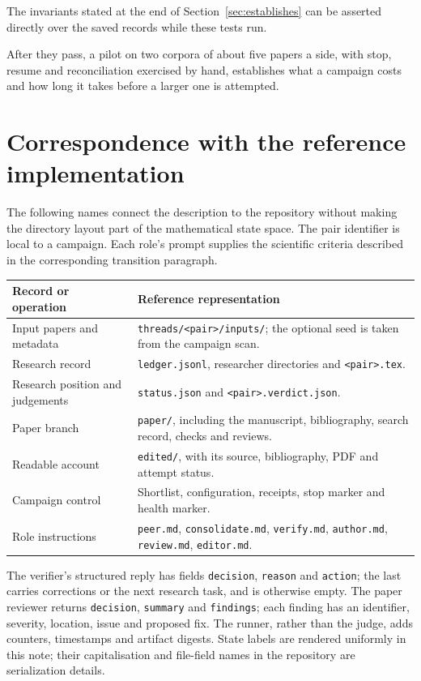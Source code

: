 \documentclass[11pt,a4paper]{article}
\newcommand{\file}[1]{\texttt{#1}}
\begin{document}
The invariants stated at the end of Section~\ref{sec:establishes} can be
asserted directly over the saved records while these tests run.

After they pass, a pilot on two corpora of about five papers a side, with stop,
resume and reconciliation exercised by hand, establishes what a campaign costs
and how long it takes before a larger one is attempted.

\section{Correspondence with the reference implementation}

The following names connect the description to the repository without making the
directory layout part of the mathematical state space. The pair identifier is
local to a campaign. Each role's prompt supplies the scientific criteria
described in the corresponding transition paragraph.

\begin{center}
\small
\begin{tabularx}{\textwidth}{@{}l>{\raggedright\arraybackslash}X@{}}
\toprule
Record or operation & Reference representation \\
\midrule
Input papers and metadata & \file{threads/<pair>/inputs/}; the optional seed is
taken from the campaign scan. \\
Research record & \file{ledger.jsonl}, researcher directories and
\file{<pair>.tex}. \\
Research position and judgements & \file{status.json} and
\file{<pair>.verdict.json}. \\
Paper branch & \file{paper/}, including the manuscript, bibliography, search
record, checks and reviews. \\
Readable account & \file{edited/}, with its source, bibliography, PDF and
attempt status. \\
Campaign control & Shortlist, configuration, receipts, stop marker and health
marker. \\
Role instructions & \file{peer.md}, \file{consolidate.md}, \file{verify.md},
\file{author.md}, \file{review.md}, \file{editor.md}. \\
\bottomrule
\end{tabularx}
\end{center}

The verifier's structured reply has fields \file{decision}, \file{reason} and
\file{action}; the last carries corrections or the next research task, and is
otherwise empty. The paper reviewer returns \file{decision}, \file{summary} and
\file{findings}; each finding has an identifier, severity, location, issue and
proposed fix. The runner, rather than the judge, adds counters, timestamps and
artifact digests. State labels are rendered uniformly in this note; their
capitalisation and file-field names in the repository are serialization details.
\end{document}
